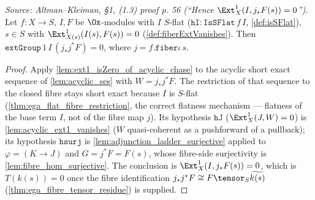 \begin{lemma}

\leanok
[$\Ext^1_X(I, j_*F(s)) = 0$ (the $T(k(s)) = 0$ assembly, up to the fibre identification)]
  \label{lem:ext1_X_pushforward_fibre_vanishes}
  \textit{Source: Altman--Kleiman, §1, (1.3) proof p. 56 (``Hence
  $\Ext^1_X(I, j_*F(s)) = 0$'').}
  Let $f : X \to S$, $I, F$ be $\Ox$-modules with $I$ $S$-flat
  ($\mathtt{hI : IsSFlat}\,f\,I$, \cref{def:isSFlat}), $s \in S$ with
  $\Ext^1_{X(s)}(I(s), F(s)) = 0$ (\cref{def:fiberExtVanishes}). Then
  $\mathtt{extGroup}\,1\,I\,(j_*j^*F) = 0$, where $j = f.\mathtt{fiber}\iota\,s$.
  \begin{proof}
    Apply \cref{lem:ext1_isZero_of_acyclic_chase} to the acyclic short exact sequence
    of \cref{lem:acyclic_ses} with $W = j_*j^*F$. The restriction of that sequence to
    the closed fibre stays short exact because $I$ is $S$-flat
    (\cref{thm:ega_flat_fibre_restriction}, the correct flatness mechanism — flatness
    of the base term $I$, not of the fibre map $j$). Its hypothesis $\mathtt{hJ}$
    ($\Ext^1_X(J, W) = 0$) is \cref{lem:acyclic_ext1_vanishes} ($W$ quasi-coherent as
    a pushforward of a pullback); its hypothesis $\mathtt{hsurj}$ is
    \cref{lem:adjunction_ladder_surjective} applied to $\varphi = (K \to J)$ and
    $G = j^*F = F(s)$, whose fibre-side surjectivity is
    \cref{lem:fibre_hom_surjective}. The conclusion is $\Ext^1_X(I, j_*F(s)) = 0$,
    which is $T(k(s)) = 0$ once the fibre identification $j_*j^*F \cong F\tensor_S
    \widetilde{k(s)}$ (\cref{thm:ega_fibre_tensor_residue}) is supplied.
  \end{proof}
\end{lemma}

